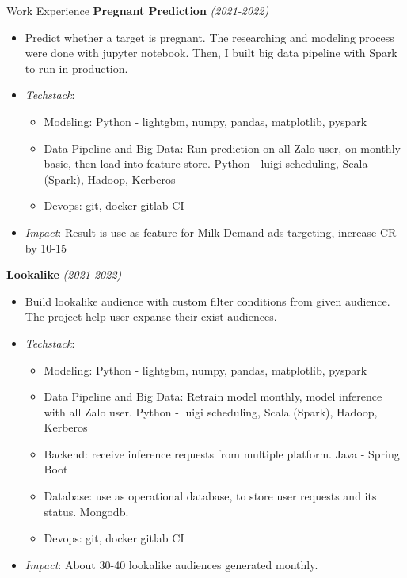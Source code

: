 \documentclass{resume} %
\begin{document}
\begin{rSection}{Work Experience}
\textbf{Pregnant Prediction } \textit{(2021-2022)}
\begin{itemize}
    \item Predict whether a target is pregnant. The researching and modeling process were done with jupyter notebook. Then, I built big data pipeline with Spark to run in production.
    \item \textit{Techstack}:
    \begin{itemize}
        \item Modeling: Python - lightgbm, numpy, pandas, matplotlib, pyspark
        \item Data Pipeline and Big Data: Run prediction on all Zalo user, on monthly basic, then load into feature store. Python - luigi scheduling, Scala (Spark), Hadoop, Kerberos
        \item Devops: git, docker gitlab CI
    \end{itemize} 
    \item \textit{Impact}: Result is use as feature for Milk Demand ads targeting, increase CR by 10-15%
\end{itemize}

\textbf{Lookalike} \textit{(2021-2022)}
\begin{itemize}
    \item Build lookalike audience with custom filter conditions from given audience. The project help user expanse their exist audiences.
    \item \textit{Techstack}:
    \begin{itemize}
        \item Modeling: Python - lightgbm, numpy, pandas, matplotlib, pyspark
        \item Data Pipeline and Big Data: Retrain model monthly,  model inference with all Zalo user. Python - luigi scheduling, Scala (Spark), Hadoop, Kerberos
        \item Backend: receive inference requests from multiple platform. Java - Spring Boot
        \item Database: use as operational database, to store user requests and its status. Mongodb.
        \item Devops: git, docker gitlab CI
    \end{itemize} 
    \item \textit{Impact}: About 30-40 lookalike audiences generated monthly.
\end{itemize}



\end{rSection}
\end{document}
